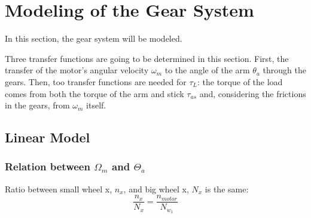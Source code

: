 \section{Modeling of the Gear System}
In this section, the gear system will be modeled. 



Three transfer functions are going to be determined in this section. First, the transfer of the motor's angular velocity $\omega_m$ to the angle of the arm $\theta_a$ through the gears. Then, too transfer functions are needed for $\tau_L$: the torque of the load comes from both the torque of the arm and stick $\tau_{as}$ and, considering the frictions in the gears, from $\omega_m$ itself.

\subsection{Linear Model}

\subsubsection*{Relation between $\Omega_m$ and $\Theta_a$}
Ratio between small wheel x, $n_x$, and big wheel x, $N_x$ is the same:
\begin{equation}
	\frac{n_x}{N_x} = \frac{n_{motor}}{N_{w_1}}
\end{equation}
